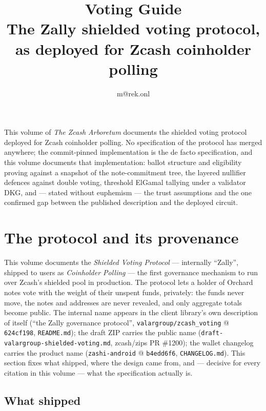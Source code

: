 \documentclass[11pt,a4paper]{article}
\title{\textbf{\Huge Voting Guide}\\[6pt]\large The Zally shielded voting protocol, as deployed for Zcash coinholder polling}
\author{m@rek.onl}
\date{}
\theoremstyle{definition}
\renewenvironment{abstract}{%
  \small\begin{center}{\bfseries\abstractname}\end{center}\medskip\noindent\ignorespaces
}{\par\medskip}
\begin{document}
\maketitle
\thispagestyle{empty}
\begin{abstract}
This volume of \emph{The Zcash Arboretum} documents the shielded voting protocol
deployed for Zcash coinholder polling. No specification of the protocol has
merged anywhere; the commit-pinned implementation is the de facto
specification, and this volume documents that implementation: ballot structure
and eligibility proving against a snapshot of the note-commitment tree, the
layered nullifier defences against double voting, threshold ElGamal tallying
under a validator DKG, and --- stated without euphemism --- the trust
assumptions and the one confirmed gap between the published description and
the deployed circuit.
\end{abstract}
\clearpage
\tableofcontents
\clearpage
\section{The protocol and its provenance}\label{sec:vote-context}

This volume documents the \emph{Shielded Voting Protocol} --- internally
``Zally'', shipped to users as \emph{Coinholder Polling} --- the first
governance mechanism to run over Zcash's shielded pool in production. The
protocol lets a holder of Orchard notes vote with the weight of their unspent
funds, privately: the funds never move, the notes and addresses are never
revealed, and only aggregate totals become public. The internal name appears
in the client library's own description of itself (``the Zally governance
protocol'', \texttt{valargroup/zcash\_voting} @ \texttt{624cf198},
\texttt{README.md}); the draft ZIP carries the public name
(\texttt{draft-valargroup-shielded-voting.md}, zcash/zips PR \#1200); the
wallet changelog carries the product name (\texttt{zashi-android} @
\texttt{b4edd6f6}, \texttt{CHANGELOG.md}). This section fixes what shipped,
where the design came from, and --- decisive for every citation in this
volume --- what the specification actually is.

\subsection{What shipped}\label{sec:vote-shipped}
\end{document}
